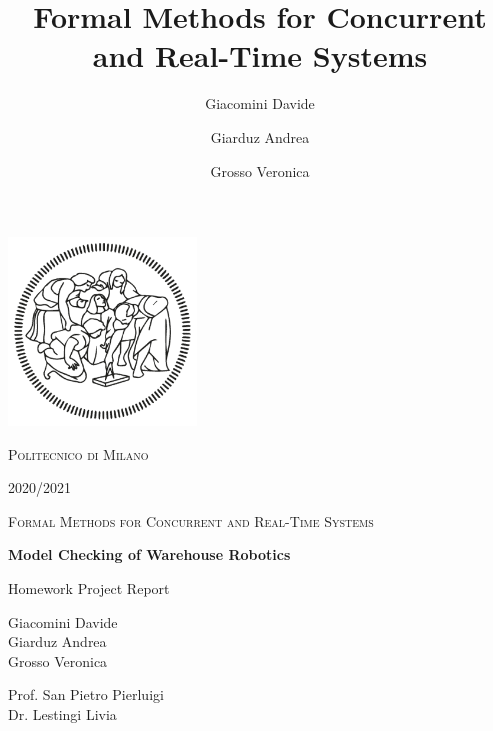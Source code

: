 \documentclass[12pt,oneside,a4paper]{article}
\title{Formal Methods for Concurrent and Real-Time Systems}
\author{Giacomini Davide \and Giarduz Andrea \and Grosso Veronica}
\begin{document}
\begin{titlepage}
\begin{center}
        \vspace*{-1,5cm}
		\includegraphics[width=5cm]{resources/logo.png}
		
        \LARGE{{\scshape Politecnico di Milano}}
        
        \LARGE{}
        
        \LARGE{2020/2021}
        
        \vspace*{1cm}
        \Large{{\scshape Formal Methods for Concurrent and Real-Time Systems}}
        
        \vspace*{1cm}
        \Huge{\textbf{Model Checking of Warehouse Robotics}}
 
 		\Large{Homework Project Report}
        \vfill
        
        \vspace*{0,8cm}
        \Large{Giacomini Davide\\
        Giarduz Andrea\\
        Grosso Veronica
        }
            
        \vspace{1,2cm}
           
        \Large
        Prof. San Pietro Pierluigi\\
        Dr. Lestingi Livia
    \end{center}
\end{titlepage}

\setcounter{tocdepth}{3}
\tableofcontents
\listoffigures
{}
\listoftables
{}

\newpage
{}





\end{document}
